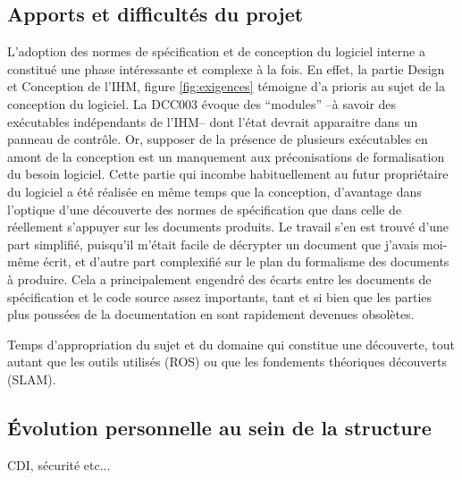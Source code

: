   \subsection{Apports et difficultés du projet}
  
  L'adoption des normes de spécification et de conception du logiciel interne a constitué une phase intéressante et complexe à la fois. 
  En effet, la partie Design et Conception de l'IHM, figure \ref{fig:exigences} témoigne d'a prioris au sujet de la conception du logiciel. 
  La DCC003 évoque des ``modules'' --à savoir des exécutables indépendants de l'IHM-- dont l'état devrait apparaitre dans un panneau de contrôle. 
  Or, supposer de la présence de plusieurs exécutables en amont de la conception est un manquement aux préconisations de formalisation du besoin logiciel. 
  Cette partie qui incombe habituellement au futur propriétaire du logiciel a été réalisée en même temps que la conception, d'avantage dans l'optique d'une découverte des normes de spécification que dans celle de réellement 
  s'appuyer sur les documents produits. Le travail s'en est trouvé d'une part simplifié, puisqu'il m'était facile de décrypter un document que j'avais moi-même écrit, et d'autre part complexifié sur le plan du formalisme
  des documents à produire. Cela a principalement engendré des écarts entre les documents de spécification et le code source assez importants, tant et si bien que les parties plus poussées de la documentation en sont 
  rapidement devenues obsolètes. 
  
  Temps d'appropriation du sujet et du domaine qui constitue une découverte, tout autant que les outils utilisés (ROS) ou que les fondements théoriques découverts (SLAM). 
  
  \subsection{\'{E}volution personnelle au sein de la structure}
  
  CDI, sécurité etc... 